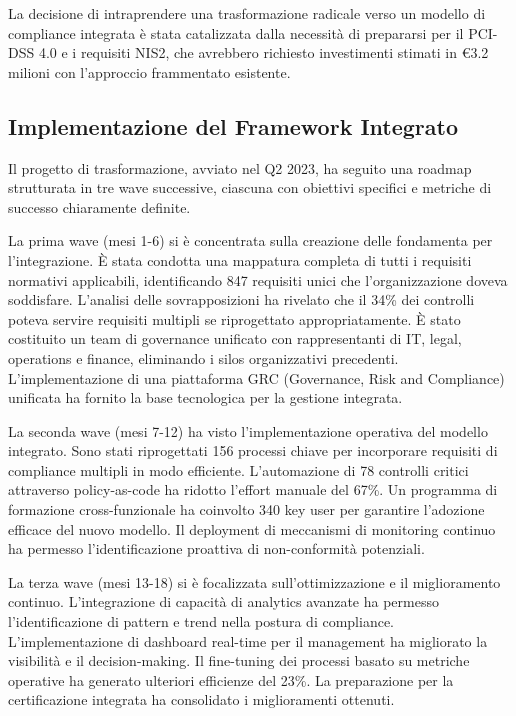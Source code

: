 La decisione di intraprendere una trasformazione radicale verso un modello di compliance integrata è stata catalizzata dalla necessità di prepararsi per il PCI-DSS 4.0 e i requisiti NIS2, che avrebbero richiesto investimenti stimati in €3.2 milioni con l'approccio frammentato esistente.

\subsection{Implementazione del Framework Integrato}

Il progetto di trasformazione, avviato nel Q2 2023, ha seguito una roadmap strutturata in tre wave successive, ciascuna con obiettivi specifici e metriche di successo chiaramente definite.

La prima wave (mesi 1-6) si è concentrata sulla creazione delle fondamenta per l'integrazione. È stata condotta una mappatura completa di tutti i requisiti normativi applicabili, identificando 847 requisiti unici che l'organizzazione doveva soddisfare. L'analisi delle sovrapposizioni ha rivelato che il 34\% dei controlli poteva servire requisiti multipli se riprogettato appropriatamente. È stato costituito un team di governance unificato con rappresentanti di IT, legal, operations e finance, eliminando i silos organizzativi precedenti. L'implementazione di una piattaforma GRC (Governance, Risk and Compliance) unificata ha fornito la base tecnologica per la gestione integrata.

La seconda wave (mesi 7-12) ha visto l'implementazione operativa del modello integrato. Sono stati riprogettati 156 processi chiave per incorporare requisiti di compliance multipli in modo efficiente. L'automazione di 78 controlli critici attraverso policy-as-code ha ridotto l'effort manuale del 67\%. Un programma di formazione cross-funzionale ha coinvolto 340 key user per garantire l'adozione efficace del nuovo modello. Il deployment di meccanismi di monitoring continuo ha permesso l'identificazione proattiva di non-conformità potenziali.

La terza wave (mesi 13-18) si è focalizzata sull'ottimizzazione e il miglioramento continuo. L'integrazione di capacità di analytics avanzate ha permesso l'identificazione di pattern e trend nella postura di compliance. L'implementazione di dashboard real-time per il management ha migliorato la visibilità e il decision-making. Il fine-tuning dei processi basato su metriche operative ha generato ulteriori efficienze del 23\%. La preparazione per la certificazione integrata ha consolidato i miglioramenti ottenuti.

